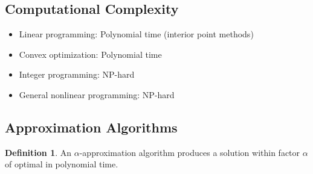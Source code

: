 \documentclass[11pt]{article}
\theoremstyle{definition}
\newtheorem{definition}{Definition}[section]
\begin{document}
\subsection{Computational Complexity}
\begin{itemize}
    \item Linear programming: Polynomial time (interior point methods)
    \item Convex optimization: Polynomial time
    \item Integer programming: NP-hard
    \item General nonlinear programming: NP-hard
\end{itemize}

\subsection{Approximation Algorithms}
\begin{definition}
An $\alpha$-approximation algorithm produces a solution within factor $\alpha$ of optimal in polynomial time.
\end{definition}
\end{document}
